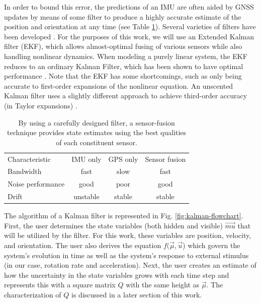 \documentclass[10pt]{article}
\begin{document}
In order to bound this error, the predictions of an IMU are often aided by GNSS updates by means of some filter to produce a highly accurate estimate of the position and orientation at any time (see Table \ref{table:fusion}). Several varieties of filters have been developed \cite{mahony, madgwick, mahony2}. For the purposes of this work, we will use an Extended Kalman filter (EKF), which allows almost-optimal fusing of various sensors while also handling nonlinear dynamics. When modeling a purely linear system, the EKF reduces to an ordinary Kalman Filter, which has been shown to have optimal performance \cite{kalman}. Note that the EKF has some shortcomings, such as only being accurate to first-order expansions of the nonlinear equation. An unscented Kalman filter uses a slightly different approach to achieve third-order accuracy (in Taylor expansions) \cite{unscented}. 

\begin{table}
\centering
\begin{tabular}{| l || c | c | c |}
  \hhline{----}
  Characteristic & IMU only & GPS only & Sensor fusion \\\hhline{|=#=|=|=|}
  Bandwidth & fast & slow & fast \\\hline 
  Noise performance & good & poor & good \\\hline 
  Drift & unstable & stable & stable \\\hline  
\end{tabular}
\caption{\label{table:fusion} By using a carefully designed filter, a sensor-fusion technique provides state estimates using the best qualities of each constituent sensor.}
\end{table}

The algorithm of a Kalman filter is represented in Fig. \ref{fig:kalman-flowchart}. First, the user determines the state variables (both hidden and visible) $\vec{mu}$ that will be utilized by the filter. For this work, these variables are position, velocity, and orientation. The user also derives the equation $f(\vec{\mu}, \vec{u}$) which govern the system's evolution in time as well as the system's response to external stimulus (in our case, rotation rate and acceleration). Next, the user creates an estimate of how the uncertainty in the state variables grows with each time step and represents this with a square matrix $Q$ with the same height as $\vec{\mu}$. The characterization of $Q$ is discussed in a later section of this work.
\end{document}
